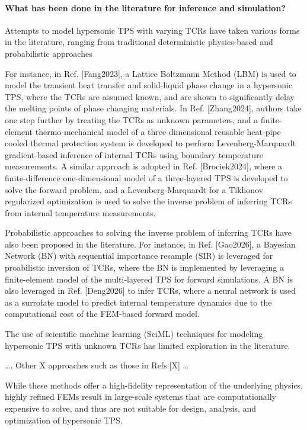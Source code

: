 \paragraph{What has been done in the literature for inference and simulation?}
Attempts to model hypersonic TPS with varying TCRs have taken various forms in the literature, ranging from traditional deterministic physics-based and probabilistic approaches

For instance, in Ref. [Fang2023], a Lattice Boltzmann Method (LBM) is used to model the transient heat transfer and solid-liquid phase change in a hypersonic TPS, where the TCRs are assumed known, and are shown to significantly delay the melting points of phase changing materials. In Ref. [Zhang2024], authors take one step further by treating the TCRs as unknown parameters, and a finite-element thermo-mechanical model of a three-dimensional reusable heat-pipe cooled thermal protection system is developed to perform Levenberg-Marquardt gradient-based inference of internal TCRs using boundary temperature measurements. A similar approach is adopted in Ref. [Brociek2024], where a finite-difference one-dimensional model of a three-layered TPS is developed to solve the forward problem, and a Levenberg-Marquardt for a Tikhonov regularized optimization is used to solve the inverse problem of inferring TCRs from internal temperature measurements. 

Probabilistic approaches to solving the inverse problem of inferring TCRs have also been proposed in the literature. For instance, in Ref. [Gao2026], a Bayesian Network (BN) with sequential importance resample (SIR) is leveraged for proabilistic inversion of TCRs, where the BN is implemented by leveraging a finite-element model of the multi-layered TPS for forward simulations. A BN is also leveraged in Ref. [Deng2026] to infer TCRs, where a neural network is used as a surrofate model to predict internal temperature dynamics due to the computational cost of the FEM-based forward model.

The use of scientific machine learning (SciML) techniques for modeling hypersonic TPS with unknown TCRs has limited exploration in the literature. 

\dots. Other X approaches such as those in Refs.[X] \dots

While these methods offer a high-fidelity representation of the underlying physics, highly refined FEMs result in large-scale systems that are computationally expensive to solve, and thus are not suitable for design, analysis, and optimization of hypersonic TPS. 

